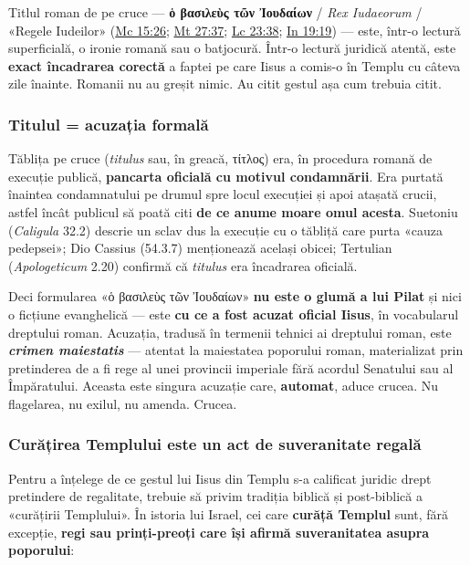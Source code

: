 \documentclass[12pt,a4paper,twoside,openany]{book}
\begin{document}
Titlul roman de pe cruce — \textbf{ὁ βασιλεὺς τῶν Ἰουδαίων} / \textit{Rex Iudaeorum} / «Regele Iudeilor» (\href{https://bibliaortodoxa.ro/carte.php?id=53\&cap=15\#26}{Mc 15:26}; \href{https://bibliaortodoxa.ro/carte.php?id=55\&cap=27\#37}{Mt 27:37}; \href{https://bibliaortodoxa.ro/carte.php?id=50\&cap=23\#38}{Lc 23:38}; \href{https://bibliaortodoxa.ro/carte.php?id=35\&cap=19\#19}{In 19:19}) — este, într-o lectură superficială, o ironie romană sau o batjocură. Într-o lectură juridică atentă, este \textbf{exact încadrarea corectă} a faptei pe care Iisus a comis-o în Templu cu câteva zile înainte. Romanii nu au greșit nimic. Au citit gestul așa cum trebuia citit.

\subsubsection*{Titulul = acuzația formală}

Tăblița pe cruce (\textit{titulus} sau, în greacă, τίτλος) era, în procedura romană de execuție publică, \textbf{pancarta oficială cu motivul condamnării}. Era purtată înaintea condamnatului pe drumul spre locul execuției și apoi atașată crucii, astfel încât publicul să poată citi \textbf{de ce anume moare omul acesta}. Suetoniu (\textit{Caligula} 32.2) descrie un sclav dus la execuție cu o tăbliță care purta «cauza pedepsei»; Dio Cassius (54.3.7) menționează același obicei; Tertulian (\textit{Apologeticum} 2.20) confirmă că \textit{titulus} era încadrarea oficială.

Deci formularea «ὁ βασιλεὺς τῶν Ἰουδαίων» \textbf{nu este o glumă a lui Pilat} și nici o ficțiune evanghelică — este \textbf{cu ce a fost acuzat oficial Iisus}, în vocabularul dreptului roman. Acuzația, tradusă în termenii tehnici ai dreptului roman, este \textbf{\textit{crimen maiestatis}} — atentat la maiestatea poporului roman, materializat prin pretinderea de a fi rege al unei provincii imperiale fără acordul Senatului sau al Împăratului. Aceasta este singura acuzație care, \textbf{automat}, aduce crucea. Nu flagelarea, nu exilul, nu amenda. Crucea.

\subsubsection*{Curățirea Templului este un act de suveranitate regală}

Pentru a înțelege de ce gestul lui Iisus din Templu s-a calificat juridic drept pretindere de regalitate, trebuie să privim tradiția biblică și post-biblică a «curățirii Templului». În istoria lui Israel, cei care \textbf{curăță Templul} sunt, fără excepție, \textbf{regi sau prinți-preoți care își afirmă suveranitatea asupra poporului}:
\end{document}
